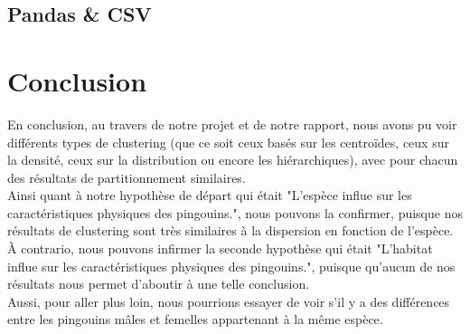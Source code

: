 \documentclass[a4paper, titlepage]{report}
\begin{document}
\subsection*{Pandas \& CSV}
\textnormal{}


\section*{Conclusion}
\textnormal{En conclusion, au travers de notre projet et de notre rapport, nous avons pu voir différents types de clustering (que ce soit ceux basés sur les centroïdes, ceux sur la densité, ceux sur la distribution ou encore les hiérarchiques), avec pour chacun des résultats de partitionnement similaires.\\
Ainsi quant à notre hypothèse de départ qui était "L'espèce influe sur les caractéristiques physiques des pingouins.", nous pouvons la confirmer, puisque nos résultats de clustering sont très similaires à la dispersion en fonction de l'espèce.\\
À contrario, nous pouvons infirmer la seconde hypothèse qui était "L'habitat influe sur les caractéristiques physiques des pingouins.", puisque qu'aucun de nos résultats nous permet d'aboutir à une telle conclusion.\\
Aussi, pour aller plus loin, nous pourrions essayer de voir s'il y a des différences entre les pingouins mâles et femelles appartenant à la même espèce.}
\end{document}
